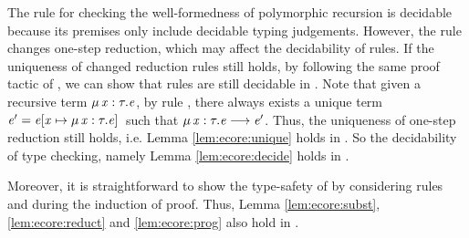 The rule  for checking the well-formedness of polymorphic recursion is decidable because its premises only include decidable typing judgements. However, the rule  changes one-step reduction, which may affect the decidability of \cast rules. If the uniqueness of changed reduction rules still holds, by following the same proof tactic of \ecore, we can show that \cast rules are still decidable in \name. Note that given a recursive term $\mu \, \mathit{x}  :  \tau  .  \mathit{e}$, by rule , there always exists a unique term $\mathit{e'}=\mathit{e}  [  \mathit{x}  \mapsto  \mu \, \mathit{x}  :  \tau  .  \mathit{e}  ] \,$ such that $\mu \, \mathit{x}  :  \tau  .  \mathit{e}  \longrightarrow  \mathit{e'}$. Thus, the uniqueness of one-step reduction still holds, i.e. Lemma \ref{lem:ecore:unique} holds in \name. So the decidability of type checking, namely Lemma \ref{lem:ecore:decide} holds in \name.

Moreover, it is straightforward to show the type-safety of \name by considering rules  and  during the induction of proof. Thus, Lemma \ref{lem:ecore:subst}, \ref{lem:ecore:reduct} and \ref{lem:ecore:prog} also hold in \name.

